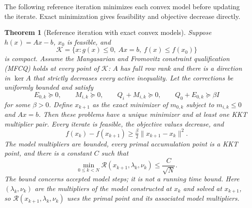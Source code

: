 \documentclass[pdflatex,sn-mathphys-num]{sn-jnl}
\theoremstyle{thmstyleone}
\newtheorem{theorem}{Theorem}[section]
\theoremstyle{thmstylethree}
\begin{document}
The following reference iteration minimizes each convex model before
updating the iterate. Exact minimization gives feasibility and objective
decrease directly.

\begin{theorem}[Reference iteration with exact convex models]\label{thm:feasible-model}
Suppose $h(x)=Ax-b$, $x_0$ is feasible, and
\[
 \mathcal K=\{x:g(x)\leq0,\ Ax=b,\ f(x)\leq f(x_0)\}
\]
is compact. Assume the Mangasarian and Fromovitz constraint qualification (MFCQ)
holds at every point of $\mathcal K$: $A$ has
full row rank and there is a direction in $\ker A$ that strictly
decreases every active inequality. Let the corrections be uniformly
bounded and satisfy
\[
 E_{0,k}\succeq0,\qquad M_{i,k}\succeq0,\qquad
 Q_i+M_{i,k}\succeq0,\qquad Q_0+E_{0,k}\succeq\beta I
\]
for some $\beta>0$. Define $x_{k+1}$ as the exact minimizer of
$m_{0,k}$ subject to $m_{i,k}\leq0$ and $Ax=b$. Then these problems
have a unique minimizer and at least one KKT multiplier pair. Every iterate is feasible,
the objective values decrease, and
\begin{equation}\label{eq:feasible-descent}
 f(x_k)-f(x_{k+1})\geq\tfrac\beta2\|x_{k+1}-x_k\|^2.
\end{equation}
The model multipliers are bounded, every primal accumulation point is a
KKT point, and there is a constant $C$ such that
\begin{equation}\label{eq:feasible-complexity}
 \min_{0\leq k<N}\mathcal R(x_{k+1},\lambda_k,\nu_k)
 \leq\frac{C}{\sqrt N}.
\end{equation}
The bound concerns accepted model steps; it is not a running time bound.
Here $(\lambda_k,\nu_k)$ are the multipliers of the model constructed at
$x_k$ and solved at $x_{k+1}$, so
$\mathcal R(x_{k+1},\lambda_k,\nu_k)$ uses the primal point and its
associated model multipliers.
\end{theorem}
\end{document}
